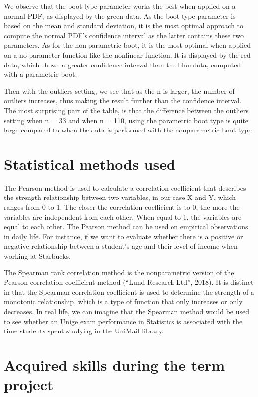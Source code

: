 \documentclass[11pt,]{article}
\begin{document}
We observe that the boot type parameter works the best when applied on a
normal PDF, as displayed by the green data. As the boot type parameter
is based on the mean and standard deviation, it is the most optimal
approach to compute the normal PDF's confidence interval as the latter
contains these two parameters. As for the non-parametric boot, it is the
most optimal when applied on a no parameter function like the nonlinear
function. It is displayed by the red data, which shows a greater
confidence interval than the blue data, computed with a parametric boot.

Then with the outliers setting, we see that as the n is larger, the
number of outliers increases, thus making the result further than the
confidence interval. The most surprising part of the table, is that the
difference between the outliers setting when n = 33 and when n = 110,
using the parametric boot type is quite large compared to when the data
is performed with the nonparametric boot type.

\hypertarget{statistical-methods-used}{%
\section{Statistical methods used}\label{statistical-methods-used}}

The Pearson method is used to calculate a correlation coefficient that
describes the strength relationship between two variables, in our case X
and Y, which ranges from 0 to 1. The closer the correlation coefficient
is to 0, the more the variables are independent from each other. When
equal to 1, the variables are equal to each other. The Pearson method
can be used on empirical observations in daily life. For instance, if we
want to evaluate whether there is a positive or negative relationship
between a student's age and their level of income when working at
Starbucks.

The Spearman rank correlation method is the nonparametric version of the
Pearson correlation coefficient method (``Lund Research Ltd'', 2018). It
is distinct in that the Spearman correlation coefficient is used to
determine the strength of a monotonic relationship, which is a type of
function that only increases or only decreases. In real life, we can
imagine that the Spearman method would be used to see whether an Unige
exam performance in Statistics is associated with the time students
spent studying in the UniMail library.

\hypertarget{acquired-skills-during-the-term-project}{%
\section{Acquired skills during the term
project}\label{acquired-skills-during-the-term-project}}
\end{document}

